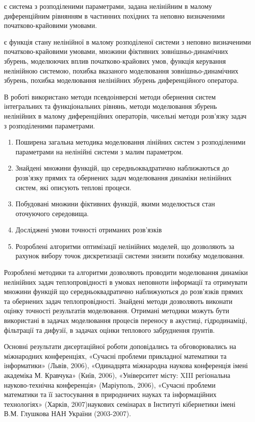{\objectofstudy} є система з розподіленими параметрами, задана нелінійним в малому диференційним рівнянням в частинних
похідних та неповно визначеними початково-крайовими умовами.

{\subjectofstudy} є функція стану нелінійної в малому розподіленої системи з неповно визначеними початково-крайовими
умовами, множини фіктивних зовнішньо-динамічних збурень, моделюючих вплив початково-крайових умов, функція керування
нелінійною системою, похибка вказаного моделювання зовнішньо-динамічних збурень, похибка моделювання нелінійних збурень диференційного оператора.

{\methodofstudy} В роботі використано методи псевдоінверсні методи обернення систем інтегральних та функціональних
рівнянь, методи моделювання збурень нелінійних в малому диференційних операторів, чисельні методи розв’язку задач з
розподіленими параметрами.

{\novelty}
\begin{enumerate}
  \item Поширена загальна методика моделювання лінійних систем з розподіленими параметрами на нелінійні системи
  з малим параметром.
  \item Знайдені множини функцій, що середньоквадратично наближаються до \\ розв’язку прямих та обернених задач
  моделювання динаміки нелінійних систем, які описують теплові процеси.
  \item Побудовані множини фіктивних функцій, якими моделюється стан оточуючого середовища.
  \item Досліджені умови точності отриманих розв’язків
  \item Розроблені алгоритми оптимізації нелінійних моделей, що дозволяють за рахунок вибору точок дискретизації
  системи знизити похибку моделювання.
\end{enumerate}

{\influence} Розроблені методики та алгоритми дозволяють проводити моделювання динаміки нелінійних задач
теплопровідності в умовах неповноти інформації та отримувати множини функцій що середньоквадратично наближуються
до розв’язків прямих  та обернених задач теплопровідності. Знайдені методи дозволяють виконати оцінку точності
результатів моделювання. Отримані методики можуть бути використані в задачах моделювання процесів переносу в
акустиці, гідродинаміці, фільтрації та дифузії, в задачах оцінки теплового забруднення ґрунтів.


{\probation}
Основні результати дисертаційної роботи доповідались та обговорювались на міжнародних конференціях,
«Сучасні проблеми прикладної математики та інформатики» (Львів, 2006), «Одинадцята міжнародна наукова конференція
імені академіка М. Кравчука» (Київ, 2006), «Університет місту: XIII регіональна науково-технічна конференція»
(Маріуполь, 2006), «Сучасні проблеми математики та її застосування в природничих науках та інформаційних технологіях»
(Харків, 2007)наукових семінарах в Інституті кібернетики імені В.М. Глушкова НАН України (2003-2007).

